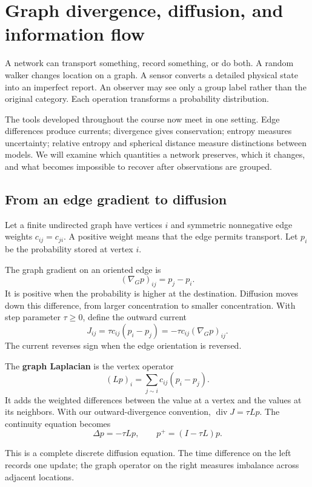 \documentclass[11pt,oneside,openany]{book}
\theoremstyle{definition}
\theoremstyle{remark}
\numberwithin{equation}{chapter}
\begin{document}
\FloatBarrier

\chapter{Graph divergence, diffusion, and information flow}
A network can transport something, record something, or do both. A random walker changes location on a graph. A sensor converts a detailed physical state into an imperfect report. An observer may see only a group label rather than the original category. Each operation transforms a probability distribution.

The tools developed throughout the course now meet in one setting. Edge differences produce currents; divergence gives conservation; entropy measures uncertainty; relative entropy and spherical distance measure distinctions between models. We will examine which quantities a network preserves, which it changes, and what becomes impossible to recover after observations are grouped.

\section{From an edge gradient to diffusion}\label{ch10-from-an-edge-gradient-to-diffusion}

Let a finite undirected graph have vertices \(i\) and symmetric nonnegative edge weights \(c_{ij}=c_{ji}\). A positive weight means that the edge permits transport. Let \(p_i\) be the probability stored at vertex \(i\).

The graph gradient on an oriented edge is \[(\nabla_G p)_{ij}=p_j-p_i.\] It is positive when the probability is higher at the destination. Diffusion moves down this difference, from larger concentration to smaller concentration. With step parameter \(\tau\geq0\), define the outward current \[J_{ij}=\tau c_{ij}(p_i-p_j)=-\tau c_{ij}(\nabla_Gp)_{ij}.\] The current reverses sign when the edge orientation is reversed.

The \textbf{graph Laplacian} is the vertex operator \[\boxed{(Lp)_i=\sum_{j\sim i}c_{ij}(p_i-p_j).}\] It adds the weighted differences between the value at a vertex and the values at its neighbors. With our outward-divergence convention, \(\operatorname{div}J=\tau Lp\). The continuity equation becomes \[\boxed{\Delta p=-\tau Lp,\qquad p^+=(I-\tau L)p.}\]

This is a complete discrete diffusion equation. The time difference on the left records one update; the graph operator on the right measures imbalance across adjacent locations.
\end{document}
